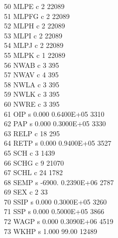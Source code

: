 \documentclass[12pt]{article}
\begin{document}
      50  MLPE       c                                  2     22089\\
      51  MLPFG      c                                  2     22089\\
      52  MLPH       c                                  2     22089\\
      53  MLPI       c                                  2     22089\\
      54  MLPJ       c                                  2     22089\\
      55  MLPK       c                                  1     22089\\
      56  NWAB       c                                  3       395\\
      57  NWAV       c                                  4       395\\
      58  NWLA       c                                  3       395\\
      59  NWLK       c                                  3       395\\
      60  NWRE       c                                  3       395\\
      61  OIP        s    0.000       0.6400E+05               3310\\
      62  PAP        s    0.000       0.3000E+05               3330\\
      63  RELP       c                                 18       295\\
      64  RETP       s    0.000       0.9400E+05               3527\\
      65  SCH        c                                  3      1439\\
      66  SCHG       c                                  9     21070\\
      67  SCHL       c                                 24      1782\\
      68  SEMP       s   -6900.       0.2390E+06               2787\\
      69  SEX        c                                  2        33\\
      70  SSIP       s    0.000       0.3000E+05               3260\\
      71  SSP        s    0.000       0.5000E+05               3866\\
      72  WAGP       s    0.000       0.3090E+06               4519\\
      73  WKHP       s    1.000        99.00                  12489\\
\end{document}
